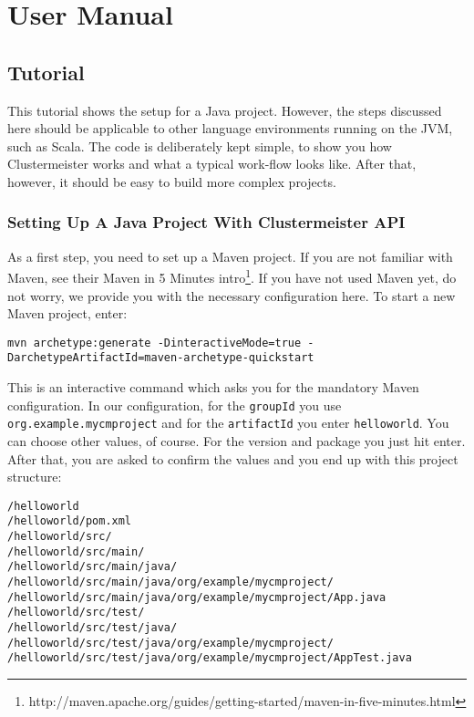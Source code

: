 \documentclass[english]{uzhpub}
\begin{document}
\section{User Manual}

\subsection{Tutorial}

This tutorial shows the setup for a Java project. However, the steps discussed here should be applicable to other language environments running on the JVM, such as Scala. The code is deliberately kept simple, to show you how Clustermeister works and what a typical work-flow looks like. After that, however, it should be easy to build more complex projects.

\subsubsection{Setting Up A Java Project With Clustermeister API}

As a first step, you need to set up a Maven project. If you are not familiar with Maven, see their Maven in 5 Minutes intro\footnote{http://maven.apache.org/guides/getting-started/maven-in-five-minutes.html}. 
If you have not used Maven yet, do not worry, we provide you with the necessary configuration here. To start a new Maven project, enter:

\begin{lstlisting}[breaklines=true, backgroundcolor=\color{lbcolor}]
 mvn archetype:generate -DinteractiveMode=true -DarchetypeArtifactId=maven-archetype-quickstart
\end{lstlisting}

This is an interactive command which asks you for the mandatory Maven configuration. In our configuration, for the \texttt{groupId} you use \texttt{org.example.mycmproject} and for the \texttt{artifactId} you enter \texttt{helloworld}. You can choose other values, of course. For the version and package you just hit enter. After that, you are asked to confirm the values and you end up with this project structure:

\begin{lstlisting}[breaklines=true, backgroundcolor=\color{lbcolor}]
/helloworld
/helloworld/pom.xml
/helloworld/src/
/helloworld/src/main/
/helloworld/src/main/java/
/helloworld/src/main/java/org/example/mycmproject/
/helloworld/src/main/java/org/example/mycmproject/App.java
/helloworld/src/test/
/helloworld/src/test/java/
/helloworld/src/test/java/org/example/mycmproject/
/helloworld/src/test/java/org/example/mycmproject/AppTest.java
\end{lstlisting}
\end{document}
